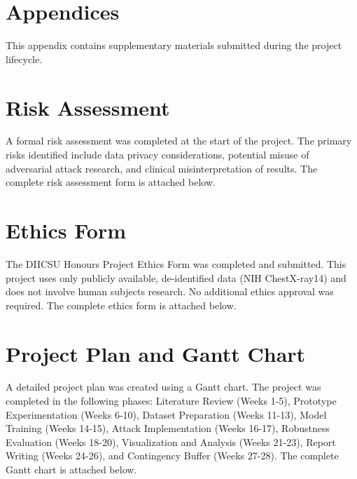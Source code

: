\documentclass[12pt,a4paper]{article}
\begin{document}
\newpage
\begin{appendices}
    \section{Appendices}
    \label{sec:appendices}
    
    This appendix contains supplementary materials submitted during the project lifecycle.
    
    \section{Risk Assessment}
    \label{app:risk}
    
    A formal risk assessment was completed at the start of the project. The primary risks identified include data privacy considerations, potential misuse of adversarial attack research, and clinical misinterpretation of results. The complete risk assessment form is attached below.
    
    
    
    \section{Ethics Form}
    \label{app:ethics}
    
    The DIICSU Honours Project Ethics Form was completed and submitted. This project uses only publicly available, de-identified data (NIH ChestX-ray14) and does not involve human subjects research. No additional ethics approval was required. The complete ethics form is attached below.
    
    
    
    \section{Project Plan and Gantt Chart}
    \label{app:gantt}
    
    A detailed project plan was created using a Gantt chart. The project was completed in the following phases: Literature Review (Weeks 1-5), Prototype Experimentation (Weeks 6-10), Dataset Preparation (Weeks 11-13), Model Training (Weeks 14-15), Attack Implementation (Weeks 16-17), Robustness Evaluation (Weeks 18-20), Visualization and Analysis (Weeks 21-23), Report Writing (Weeks 24-26), and Contingency Buffer (Weeks 27-28). The complete Gantt chart is attached below.
    

\end{appendices}
\end{document}
